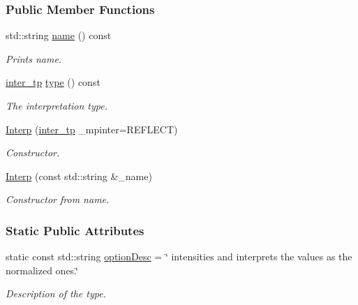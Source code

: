 \subsubsection*{Public Member Functions}
\begin{DoxyCompactItemize}
\item 
std::string \hyperlink{group__edeiedei_ga9473b5ac52a3b4d72a1569eb3719ee4c}{name} () const 
\begin{DoxyCompactList}\small\item\em Prints name. \item\end{DoxyCompactList}\item 
\hyperlink{classInterp_a48f7a943f951c25a9717d1849cf7cd87}{inter\_\-tp} \hyperlink{group__edeiedei_ga0fb3fe592af6060f4d27b7e59e864808}{type} () const 
\begin{DoxyCompactList}\small\item\em The interpretation type. \item\end{DoxyCompactList}\item 
\hyperlink{group__edeiedei_ga039d1a049fa99eb2238712041637945e}{Interp} (\hyperlink{classInterp_a48f7a943f951c25a9717d1849cf7cd87}{inter\_\-tp} \_\-mpinter=REFLECT)
\begin{DoxyCompactList}\small\item\em Constructor. \item\end{DoxyCompactList}\item 
\hyperlink{group__edeiedei_ga3d8b610ff638db6518ab5f538bbbae07}{Interp} (const std::string \&\_\-name)
\begin{DoxyCompactList}\small\item\em Constructor from name. \item\end{DoxyCompactList}\end{DoxyCompactItemize}
\subsubsection*{Static Public Attributes}
\begin{DoxyCompactItemize}
\item 
static const std::string \hyperlink{group__edeiedei_gad0a1bf1abf92a9db8a77c55470a31027}{optionDesc} = \char`\"{} intensities and interprets the values as the normalized ones.\char`\"{}
\begin{DoxyCompactList}\small\item\em Description of the type. \item\end{DoxyCompactList}\end{DoxyCompactItemize}
